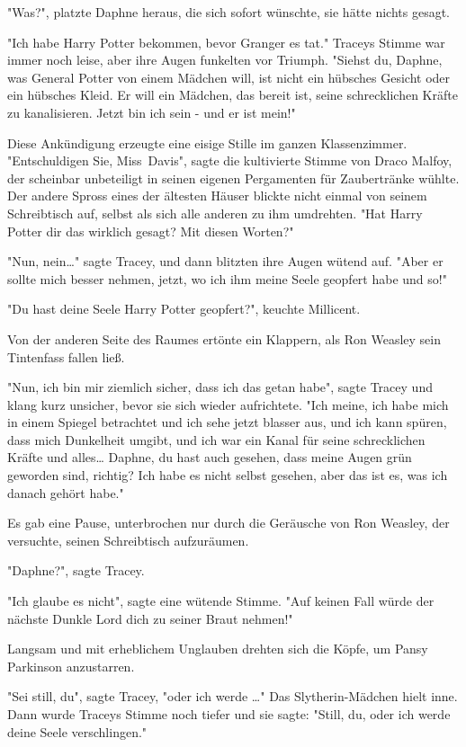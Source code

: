 {"Was?", platzte Daphne heraus, die sich sofort wünschte, sie hätte nichts gesagt.

"Ich habe Harry Potter bekommen, bevor Granger es tat." Traceys Stimme war immer noch leise, aber ihre Augen funkelten vor Triumph. "Siehst du, Daphne, was General Potter von einem Mädchen will, ist nicht ein hübsches Gesicht oder ein hübsches Kleid. Er will ein Mädchen, das bereit ist, seine schrecklichen Kräfte zu kanalisieren. Jetzt bin ich sein - und er ist mein!"

Diese Ankündigung erzeugte eine eisige Stille im ganzen Klassenzimmer. "Entschuldigen Sie, Miss~Davis", sagte die kultivierte Stimme von Draco Malfoy, der scheinbar unbeteiligt in seinen eigenen Pergamenten für Zaubertränke wühlte. Der andere Spross eines der ältesten Häuser blickte nicht einmal von seinem Schreibtisch auf, selbst als sich alle anderen zu ihm umdrehten. "Hat Harry Potter dir das wirklich gesagt? Mit diesen Worten?"

"Nun, nein…" sagte Tracey, und dann blitzten ihre Augen wütend auf. "Aber er sollte mich besser nehmen, jetzt, wo ich ihm meine Seele geopfert habe und so!"

"Du hast deine Seele Harry Potter geopfert?", keuchte Millicent.

Von der anderen Seite des Raumes ertönte ein Klappern, als Ron Weasley sein Tintenfass fallen ließ.

"Nun, ich bin mir ziemlich sicher, dass ich das getan habe", sagte Tracey und klang kurz unsicher, bevor sie sich wieder aufrichtete. "Ich meine, ich habe mich in einem Spiegel betrachtet und ich sehe jetzt blasser aus, und ich kann spüren, dass mich Dunkelheit umgibt, und ich war ein Kanal für seine schrecklichen Kräfte und alles… Daphne, du hast auch gesehen, dass meine Augen grün geworden sind, richtig? Ich habe es nicht selbst gesehen, aber das ist es, was ich danach gehört habe."

Es gab eine Pause, unterbrochen nur durch die Geräusche von Ron Weasley, der versuchte, seinen Schreibtisch aufzuräumen.

"Daphne?", sagte Tracey.

"Ich glaube es nicht", sagte eine wütende Stimme. "Auf keinen Fall würde der nächste Dunkle Lord dich zu seiner Braut nehmen!"

Langsam und mit erheblichem Unglauben drehten sich die Köpfe, um Pansy Parkinson anzustarren.

"Sei still, du", sagte Tracey, "oder ich werde …" Das Slytherin-Mädchen hielt inne. Dann wurde Traceys Stimme noch tiefer und sie sagte: "Still, du, oder ich werde deine Seele verschlingen."

}
